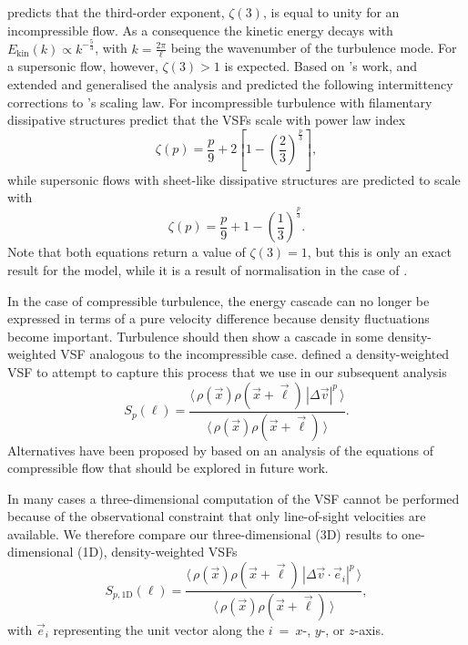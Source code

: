 \citet{Kolmogorov1941} predicts that the third-order exponent, $\zeta(3)$, is equal to unity for an incompressible flow.
As a consequence the kinetic energy decays with $E_{\mathrm{kin}}(k) \propto k^{-\frac{5}{3}}$, with $k = \frac{2 \pi}{\ell}$ being the wavenumber of the turbulence mode.
For a supersonic flow, however, $\zeta(3) >1$ is expected.
Based on \citeauthor{Kolmogorov1941}'s work, \citet{She1994} and \citet{Boldyrev2002} extended and generalised the analysis and predicted the following intermittency corrections to \citeauthor{Kolmogorov1941}'s scaling law.
For incompressible turbulence with filamentary dissipative structures \citet{She1994} predict that
the VSFs scale with power law index
\begin{equation}
	\zeta(p) = \frac{p}{9} + 2 \left[ 1 - \left( \frac{2}{3} \right)^{\frac{p}{3}} \right] ,
	\label{equ:method:she}
\end{equation}
while supersonic flows with sheet-like dissipative structures are predicted to scale with \citep{Boldyrev2002}
\begin{equation}
	\zeta(p) = \frac{p}{9} + 1 - \left( \frac{1}{3} \right)^{\frac{p}{3}}.
	\label{equ:method:boldyrev}
\end{equation}
\noindent
Note that both equations return a value of $\zeta(3) =1$, but this is only an exact result for the \citeauthor{She1994} model, while it is a result of normalisation in the case of \citeauthor{Boldyrev2002}. 

In the case of compressible turbulence, the energy cascade can no longer be expressed in terms of a pure velocity difference because density fluctuations become important.
Turbulence should then show a cascade in some density-weighted VSF analogous to the incompressible case.
\citet{Padoan2016a} defined a density-weighted VSF to attempt to capture this process that we use in our subsequent analysis
\begin{equation}
	{S}_p (\ell) = \frac{\langle \, \rho(\vec{x}) \rho(\vec{x}+\vec{\ell}) \, |\Delta \vec{v}|^p  \, \rangle}{\langle  \, \rho(\vec{x}) \rho(\vec{x}+\vec{\ell}) \, \rangle}.
	\label{equ:method:def_vsf_dw}
\end{equation}
Alternatives have been proposed by \citet{Kritsuk2013a} based on an analysis of the equations of compressible flow that should be explored in future work.

In many cases a three-dimensional computation of the VSF cannot be performed because of the observational constraint that only line-of-sight velocities are available.
We therefore compare our three-dimensional (3D) results to one-dimensional (1D), density-weighted VSFs
\begin{equation}
	\mathit{S}_{p,\mathrm{1D}} (\ell) = \frac{\langle \, \rho(\vec{x}) \rho(\vec{x}+\vec{\ell}) \, |\Delta 
        \vec{v} \cdot \vec{e}_i|^p  \, \rangle}{\langle  \, \rho(\vec{x}) \rho(\vec{x}+\vec{\ell}) \, \rangle} ,
	\label{equ:method:def_vsf_1d}
\end{equation}
with $\vec{e}_i$ representing the unit vector along the $i$~=~$x$-, $y$-, or $z$-axis.

